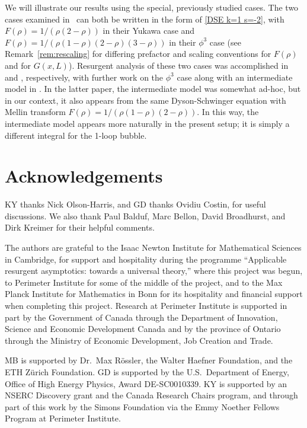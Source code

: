 \documentclass[oneside]{amsart}
\theoremstyle{definition}
\begin{document}
We will illustrate our results using the special, previously studied cases.
The two cases examined in~\cite{bkerfc} can both be written in the form of \eqref{DSE k=1 s=-2}, 
with $F(\rho) = 1/(\rho(2-\rho))$ in their Yukawa case and 
$F(\rho) = 1/(\rho(1-\rho)(2-\rho)(3-\rho))$ in their $\phi^3$ case
(see Remark~\ref{rem:rescaling} for differing prefactor and scaling conventions for $F(\rho)$ and for $G(x,L)$).  Resurgent analysis of these two cases was accomplished in \cite{BD} and \cite{BDM}, respectively, with further work on the $\phi^3$ case along with an intermediate model in \cite{BB}.  In the latter paper, the intermediate model was somewhat ad-hoc, but in our context, it also appears from the same Dyson-Schwinger equation with Mellin transform $F(\rho) = 1/(\rho(1-\rho)(2-\rho))$. In this way, the intermediate model appears more naturally in the present setup; it is simply a different integral for the 1-loop bubble.

\section*{Acknowledgements}

KY thanks Nick Olson-Harris, and GD thanks Ovidiu Costin, for useful discussions. 
We also thank Paul Balduf, Marc Bellon, David Broadhurst, and Dirk Kreimer for their helpful comments.

The authors are grateful to the Isaac Newton Institute for Mathematical Sciences in Cambridge, for support and hospitality during the programme ``Applicable resurgent asymptotics: towards a universal theory,'' where this project was begun, to Perimeter Institute for some of the middle of the project,
and to the Max Planck Institute for Mathematics in Bonn for its hospitality and financial support when completing this project.  Research at Perimeter Institute is supported in part by the Government of Canada through the
Department of Innovation, Science and Economic Development Canada and by the province of
Ontario through the Ministry of Economic Development, Job Creation and Trade. 

MB is supported by Dr.\ Max Rössler, the Walter Haefner Foundation, and the ETH Zürich Foundation.
GD is supported by the U.S.\ Department of Energy, Office of High Energy Physics, Award DE-SC0010339.
KY is supported by an NSERC Discovery grant and the Canada Research Chairs program, and through part of this work by the Simons Foundation via the Emmy Noether Fellows Program at Perimeter Institute. 
\end{document}
